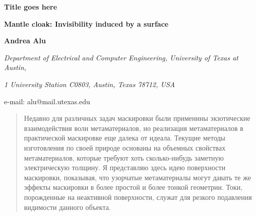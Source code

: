 \documentclass[12pt,a4paper]{article}
\newcommand{\tit}[1]{\begin{center}{\bf{\Large #1}}\end{center}}
\newcommand{\aut}[1]{\centerline{{\bf #1}}}
\newcommand{\cityorg}[1]{\centerline{\it #1}}
\newcommand{\email}[1]{\centerline{{\small e-mail: #1}}\vspace{\baselineskip}}
\begin{document}
\sloppy

 \tit{Title goes here}
 \tit{Mantle cloak: Invisibility induced by a surface}
 \aut{Andrea Alu}
 \cityorg{Department of Electrical and Computer Engineering, 
 University of Texas at Austin,}
 \cityorg{1 University Station C0803, Austin,  Texas 78712, USA}
 \email{alu@mail.utexas.edu}

\begin{abstract}
Недавно для различных задач маскировки были применины экзотические взаимодействия волн
метаматериалов, но реализация метаматериалов в практической маскировке еще далека от
идеала. Текущие методы изготовления по своей природе основаны на объемных свойствах
метаматериалов, которые требуют хоть сколько-нибудь заметную электрическую толщину.
Я представляю здесь идею поверхности маскировки, показывая, что узорчатые 
метаматериалы могут давать те же эффекты маскировки в более простой и более тонкой 
геометрии. Токи, порожденные на неактивной поверхности, служат для резкого подавления 
видимости данного объекта. 
\end{abstract}

\setcounter{secnumdepth}{5}
\end{document}
